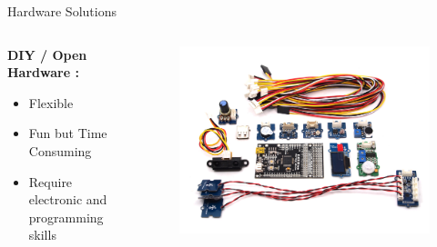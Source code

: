 \documentclass{beamer}
\begin{document}
\begin{frame}{Hardware Solutions}
\begin{columns}
\begin{column}[l]{0.5\textwidth}
\textbf{DIY / Open Hardware :}
\begin{itemize}
\item[\Large\smiley]Flexible
\item[\Large\smiley]Fun but Time Consuming
\item[\Large\frownie] Require electronic and programming skills
\end{itemize}
\end{column}
\begin{column}[r]{0.5\textwidth}
\begin{figure}
\includegraphics[width=\columnwidth]{./figures/kit.jpg}
\end{figure}
\end{column}
\end{columns}
\end{frame}
\end{document}
